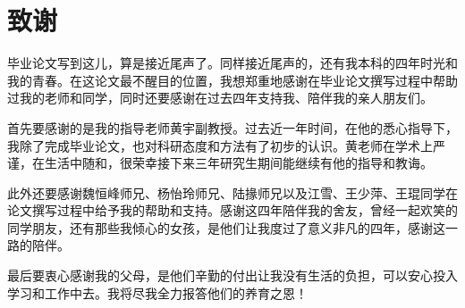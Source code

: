 ﻿%
\chapter*{致\qquad 谢}

毕业论文写到这儿，算是接近尾声了。同样接近尾声的，还有我本科的四年时光和我的青春。在这论文最不醒目的位置，我想郑重地感谢在毕业论文撰写过程中帮助过我的老师和同学，同时还要感谢在过去四年支持我、陪伴我的亲人朋友们。

首先要感谢的是我的指导老师黄宇副教授。过去近一年时间，在他的悉心指导下，我除了完成毕业论文，也对科研态度和方法有了初步的认识。黄老师在学术上严谨，在生活中随和，很荣幸接下来三年研究生期间能继续有他的指导和教诲。

此外还要感谢魏恒峰师兄、杨怡玲师兄、陆掾师兄以及江雪、王少萍、王琨同学在论文撰写过程中给予我的帮助和支持。感谢这四年陪伴我的舍友，曾经一起欢笑的同学朋友，还有那些我倾心的女孩，是他们让我度过了意义非凡的四年，感谢这一路的陪伴。

最后要衷心感谢我的父母，是他们辛勤的付出让我没有生活的负担，可以安心投入学习和工作中去。我将尽我全力报答他们的养育之恩！


